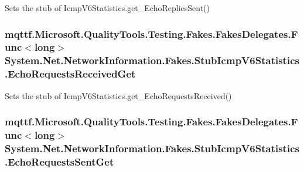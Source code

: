 Sets the stub of Icmp\-V6\-Statistics.\-get\-\_\-\-Echo\-Replies\-Sent()

\hypertarget{class_system_1_1_net_1_1_network_information_1_1_fakes_1_1_stub_icmp_v6_statistics_ac2159e1f08a68f83eb38431a54148db7}{
\subsubsection[{Echo\-Requests\-Received\-Get}]{\setlength{\rightskip}{0pt plus 5cm}mqttf.\-Microsoft.\-Quality\-Tools.\-Testing.\-Fakes.\-Fakes\-Delegates.\-Func$<$long$>$ System.\-Net.\-Network\-Information.\-Fakes.\-Stub\-Icmp\-V6\-Statistics.\-Echo\-Requests\-Received\-Get}}\label{class_system_1_1_net_1_1_network_information_1_1_fakes_1_1_stub_icmp_v6_statistics_ac2159e1f08a68f83eb38431a54148db7}


Sets the stub of Icmp\-V6\-Statistics.\-get\-\_\-\-Echo\-Requests\-Received()

\hypertarget{class_system_1_1_net_1_1_network_information_1_1_fakes_1_1_stub_icmp_v6_statistics_aa127ce0a2001552bb7d9a474e5a76d9c}{
\subsubsection[{Echo\-Requests\-Sent\-Get}]{\setlength{\rightskip}{0pt plus 5cm}mqttf.\-Microsoft.\-Quality\-Tools.\-Testing.\-Fakes.\-Fakes\-Delegates.\-Func$<$long$>$ System.\-Net.\-Network\-Information.\-Fakes.\-Stub\-Icmp\-V6\-Statistics.\-Echo\-Requests\-Sent\-Get}}\label{class_system_1_1_net_1_1_network_information_1_1_fakes_1_1_stub_icmp_v6_statistics_aa127ce0a2001552bb7d9a474e5a76d9c}


